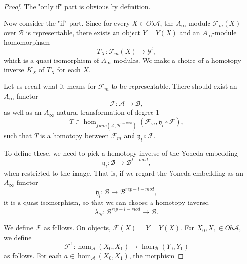 \documentclass{amsart}
\numberwithin{equation}{section}
\numberwithin{figure}{section}
\begin{document}
\begin{proof}
	The "only if" part is obvious by definition. \par	
	Now consider the "if" part. Since for every $X \in Ob\mathcal{A}$, the $A_{\infty}$-module $\mathcal{F}_{m}(X)$ over $\mathcal{B}$ is representable, there exists an object $Y = Y(X)$ and an $A_{\infty}$-module homomorphism
\begin{equation}
T_{X}: \mathcal{F}_{m}(X) \to \mathcal{Y}^{l},
\end{equation}
which is a quasi-isomorphism of $A_{\infty}$-modules. We make a choice of a homotopy inverse $K_{X}$ of $T_{X}$ for each $X$. \par

	Let us recall what it means for $\mathcal{F}_{m}$ to be representable. There should exist an $A_{\infty}$-functor
\begin{equation*}
\mathcal{F}: \mathcal{A} \to \mathcal{B},
\end{equation*}
as well as an $A_{\infty}$-natural transformation of degree $1$
\begin{equation*}
T \in \hom_{func(\mathcal{A}, \mathcal{B}^{l-mod})}(\mathcal{F}_{m}, \mathfrak{y}_{l} \circ \mathcal{F}),
\end{equation*}
such that $T$ is a homotopy between $\mathcal{F}_{m}$ and $\mathfrak{y}_{l} \circ \mathcal{F}$. \par
	To define these, we need to pick a homotopy inverse of the Yoneda embedding
\begin{equation*}
\mathfrak{y}_{l}: \mathcal{B} \to \mathcal{B}^{l-mod},
\end{equation*}
when restricted to the image. That is, if we regard the Yoneda embedding as an $A_{\infty}$-functor
\begin{equation*}
\mathfrak{y}_{l}: \mathcal{B} \to \mathcal{B}^{rep-l-mod},
\end{equation*}
it is a quasi-isomorphism, so that we can choose a homotopy inverse,
\begin{equation}
\lambda_{\mathcal{B}}: \mathcal{B}^{rep-l-mod} \to \mathcal{B}.
\end{equation} \par
	We define $\mathcal{F}$ as follows. On objects, $\mathcal{F}(X) = Y = Y(X)$. For $X_{0}, X_{1} \in Ob\mathcal{A}$, we define
\begin{equation}
\mathcal{F}^{1}: \hom_{\mathcal{A}}(X_{0}, X_{1}) \to \hom_{\mathcal{B}}(Y_{0}, Y_{1})
\end{equation}
as follows. For each $a \in \hom_{\mathcal{A}}(X_{0}, X_{1})$, the morphism 

\end{proof}
\end{document}
